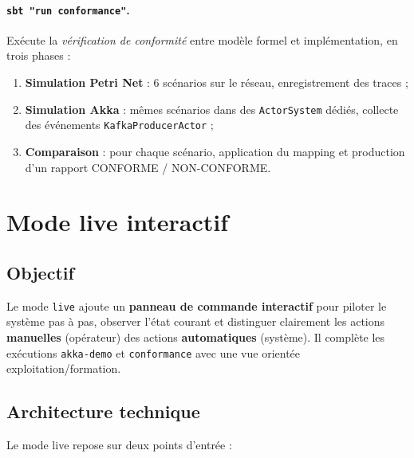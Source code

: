 \documentclass[11pt,a4paper]{article}
\newcommand{\code}[1]{\texttt{#1}}
\begin{document}
\paragraph{\code{sbt "run conformance"}.}
Exécute la \emph{vérification de conformité} entre modèle formel et
implémentation, en trois phases :
\begin{enumerate}[leftmargin=1.2cm,itemsep=1pt]
  \item \textbf{Simulation Petri Net} : 6 scénarios sur le réseau,
        enregistrement des traces ;
  \item \textbf{Simulation Akka} : mêmes scénarios dans des
        \code{ActorSystem} dédiés, collecte des événements
        \code{KafkaProducerActor} ;
  \item \textbf{Comparaison} : pour chaque scénario, application du
        mapping et production d'un rapport CONFORME / NON-CONFORME.
\end{enumerate}

\section{Mode live interactif}

\subsection{Objectif}

Le mode \code{live} ajoute un \textbf{panneau de commande interactif} pour
piloter le système pas à pas, observer l'état courant et distinguer
clairement les actions \textbf{manuelles} (opérateur) des actions
\textbf{automatiques} (système). Il complète les exécutions
\code{akka-demo} et \code{conformance} avec une vue orientée
exploitation/formation.

\subsection{Architecture technique}

Le mode live repose sur deux points d'entrée :
\end{document}
